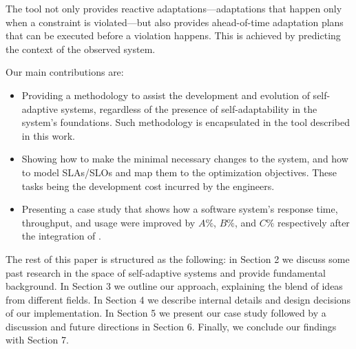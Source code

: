 The tool not only provides reactive adaptations---adaptations that happen only when a constraint is violated---but also provides ahead-of-time adaptation plans that can be executed before a violation happens. This is achieved by predicting the context of the observed system.

Our main contributions are:

\begin{itemize}
  \item Providing a methodology to assist the development and evolution of self-adaptive systems, regardless of the presence of self-adaptability in the system's foundations. Such methodology is encapsulated in the tool described in this work.
  \item Showing how to make the minimal necessary changes to the system, and how to model SLAs/SLOs and map them to the optimization objectives. These tasks being the development cost incurred by the engineers.
  \item Presenting a case study that shows how a software system's response time, throughput, and usage were improved by $A\%$, $B\%$, and $C\%$ respectively after the integration of \projectname{}.
\end{itemize}

The rest of this paper is structured as the following: in Section 2 we discuss some past research in the space of self-adaptive systems and provide fundamental background. In Section 3 we outline our approach, explaining the blend of ideas from different fields. In Section 4 we describe internal details and design decisions of our implementation. In Section 5 we present our case study followed by a discussion and future directions in Section 6. Finally, we conclude our findings with Section 7.

%



